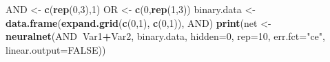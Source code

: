 \documentclass[]{article}
\newenvironment{Shaded}{\begin{snugshade}}{\end{snugshade}}
\newcommand{\DataTypeTok}[1]{\textcolor[rgb]{0.13,0.29,0.53}{#1}}
\newcommand{\DecValTok}[1]{\textcolor[rgb]{0.00,0.00,0.81}{#1}}
\newcommand{\KeywordTok}[1]{\textcolor[rgb]{0.13,0.29,0.53}{\textbf{#1}}}
\newcommand{\NormalTok}[1]{#1}
\newcommand{\OperatorTok}[1]{\textcolor[rgb]{0.81,0.36,0.00}{\textbf{#1}}}
\newcommand{\OtherTok}[1]{\textcolor[rgb]{0.56,0.35,0.01}{#1}}
\newcommand{\StringTok}[1]{\textcolor[rgb]{0.31,0.60,0.02}{#1}}
\begin{document}
\begin{Shaded}
\begin{Highlighting}[]
\NormalTok{AND <-}\StringTok{ }\KeywordTok{c}\NormalTok{(}\KeywordTok{rep}\NormalTok{(}\DecValTok{0}\NormalTok{,}\DecValTok{3}\NormalTok{),}\DecValTok{1}\NormalTok{)}
\NormalTok{OR <-}\StringTok{ }\KeywordTok{c}\NormalTok{(}\DecValTok{0}\NormalTok{,}\KeywordTok{rep}\NormalTok{(}\DecValTok{1}\NormalTok{,}\DecValTok{3}\NormalTok{))}
\NormalTok{binary.data <-}\StringTok{ }\KeywordTok{data.frame}\NormalTok{(}\KeywordTok{expand.grid}\NormalTok{(}\KeywordTok{c}\NormalTok{(}\DecValTok{0}\NormalTok{,}\DecValTok{1}\NormalTok{), }\KeywordTok{c}\NormalTok{(}\DecValTok{0}\NormalTok{,}\DecValTok{1}\NormalTok{)), AND)}
\KeywordTok{print}\NormalTok{(net <-}\StringTok{ }\KeywordTok{neuralnet}\NormalTok{(AND}\OperatorTok{~}\NormalTok{Var1}\OperatorTok{+}\NormalTok{Var2, binary.data, }\DataTypeTok{hidden=}\DecValTok{0}\NormalTok{, }\DataTypeTok{rep=}\DecValTok{10}\NormalTok{, }\DataTypeTok{err.fct=}\StringTok{"ce"}\NormalTok{, }\DataTypeTok{linear.output=}\OtherTok{FALSE}\NormalTok{))}
\end{Highlighting}
\end{Shaded}
\end{document}
